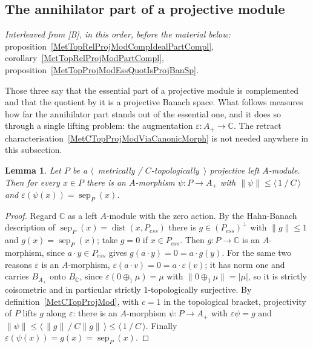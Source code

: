 \documentclass[11pt]{article}
\theoremstyle{plain}
\newtheorem{lemma}[theorem]{Lemma}
\theoremstyle{definition}
\DeclareMathOperator{\dist}{dist}
\DeclareMathOperator{\sep}{sep}
\begin{document}
\subsection{The annihilator part of a projective module}\label{SubSectionAnnihPartOfProjMod}

\emph{Interleaved from [B], in this order, before the material below:}
proposition~\ref{MetTopRelProjModCompIdealPartCompl},
corollary~\ref{MetTopRelProjModPartCompl},
proposition~\ref{MetTopProjModEssQuotIsProjBanSp}.

Those three say that the essential part of a projective module is complemented
and that the quotient by it is a projective Banach space. What follows measures
how far the annihilator part stands out of the essential one, and it does so
through a single lifting problem: the augmentation $\varepsilon:A_+\to\mathbb{C}$.
The retract characterisation~\ref{MetCTopProjModViaCanonicMorph} is not needed
anywhere in this subsection.

\begin{lemma}\label{ProjLiftAlongAugmentation}
Let $P$ be a $\langle$~metrically / $C$-topologically~$\rangle$ projective left
$A$-module. Then for every $x\in P$ there is an $A$-morphism $\psi:P\to A_+$ with
$\lVert\psi\rVert\leq\langle\,1\ /\ C\,\rangle$ and
$\varepsilon(\psi(x))=\sep_P(x)$.
\end{lemma}

\begin{proof}
Regard $\mathbb{C}$ as a left $A$-module with the zero action. By the
Hahn-Banach description of $\sep_P(x)=\dist(x,P_{ess})$ there is
$g\in{(P_{ess})}^\perp$ with $\lVert g\rVert\leq 1$ and $g(x)=\sep_P(x)$; take
$g=0$ if $x\in P_{ess}$. Then $g:P\to\mathbb{C}$ is an $A$-morphism, since
$a\cdot y\in P_{ess}$ gives $g(a\cdot y)=0=a\cdot g(y)$. For the same two reasons
$\varepsilon$ is an $A$-morphism,
$\varepsilon(a\cdot v)=0=a\cdot\varepsilon(v)$; it has norm one and carries
$B_{A_+}$ onto $B_{\mathbb{C}}$, since $\varepsilon(0\oplus_1\mu)=\mu$ with
$\lVert 0\oplus_1\mu\rVert=|\mu|$, so it is strictly coisometric and in
particular strictly $1$-topologically surjective. By
definition~\ref{MetCTopProjMod}, with $c=1$ in the topological bracket,
projectivity of $P$ lifts $g$ along $\varepsilon$: there is an $A$-morphism
$\psi:P\to A_+$ with $\varepsilon\psi=g$ and
$\lVert\psi\rVert\leq\langle\,\lVert g\rVert\ /\ C\lVert g\rVert\,\rangle
\leq\langle\,1\ /\ C\,\rangle$. Finally
$\varepsilon(\psi(x))=g(x)=\sep_P(x)$.
\end{proof}
\end{document}
